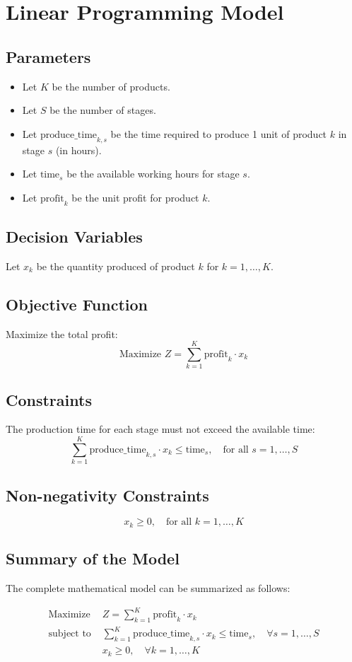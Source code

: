 \documentclass{article}
\begin{document}
\section*{Linear Programming Model}

\subsection*{Parameters}
\begin{itemize}
    \item Let \( K \) be the number of products.
    \item Let \( S \) be the number of stages.
    \item Let \( \text{produce\_time}_{k,s} \) be the time required to produce 1 unit of product \( k \) in stage \( s \) (in hours).
    \item Let \( \text{time}_{s} \) be the available working hours for stage \( s \).
    \item Let \( \text{profit}_{k} \) be the unit profit for product \( k \).
\end{itemize}

\subsection*{Decision Variables}
Let \( x_k \) be the quantity produced of product \( k \) for \( k = 1, \ldots, K \).

\subsection*{Objective Function}
Maximize the total profit:
\[
\text{Maximize } Z = \sum_{k=1}^{K} \text{profit}_{k} \cdot x_k
\]

\subsection*{Constraints}
The production time for each stage must not exceed the available time:
\[
\sum_{k=1}^{K} \text{produce\_time}_{k,s} \cdot x_k \leq \text{time}_{s}, \quad \text{for all } s = 1, \ldots, S
\]

\subsection*{Non-negativity Constraints}
\[
x_k \geq 0, \quad \text{for all } k = 1, \ldots, K
\]

\subsection*{Summary of the Model}
The complete mathematical model can be summarized as follows:

\begin{align*}
\text{Maximize } & Z = \sum_{k=1}^{K} \text{profit}_{k} \cdot x_k \\
\text{subject to } & \sum_{k=1}^{K} \text{produce\_time}_{k,s} \cdot x_k \leq \text{time}_{s}, \quad \forall s = 1, \ldots, S \\
& x_k \geq 0, \quad \forall k = 1, \ldots, K
\end{align*}
\end{document}
